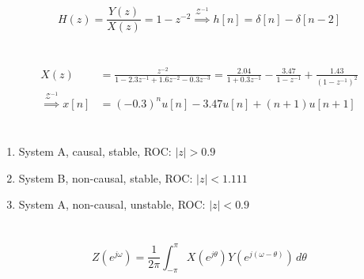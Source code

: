\documentclass{article}
\begin{document}
\subsection{}

\begin{equation}
    H(z) = \frac{Y(z)}{X(z)} = 1 - z^{-2} \overset{\mathcal{Z}^{-1}}{\implies} h[n] = \delta[n] - \delta[n - 2]
\end{equation}

\newpage
\section{}

\begin{align}
    X(z) &= \frac{z^{-2}}{1 - 2.3z^{-1} + 1.6z^{-2} - 0.3z^{-3}} = \frac{2.04}{1 + 0.3z^{-1}} - \frac{3.47}{1 - z^{-1}} + \frac{1.43}{(1 - z^{-1})^2} \\
    \overset{\mathcal{Z}^{-1}}{\implies} x[n] &= (-0.3)^n u[n] - 3.47 u[n] + (n + 1) u[n + 1]
\end{align}

\newpage
\section{}

\begin{enumerate}
    \item System A, causal, stable, ROC: \(|z| > 0.9\)
    \item System B, non-causal, stable, ROC: \(|z| < 1.111\)
    \item System A, non-causal, unstable, ROC: \(|z| < 0.9\)
\end{enumerate}

\newpage
\section{}

\begin{equation}
    Z(e^{j \omega}) = \frac{1}{2\pi} \int_{-\pi}^\pi X(e^{j \theta}) Y(e^{j (\omega - \theta)}) \, d\theta
\end{equation}

\subsection{}
\end{document}
